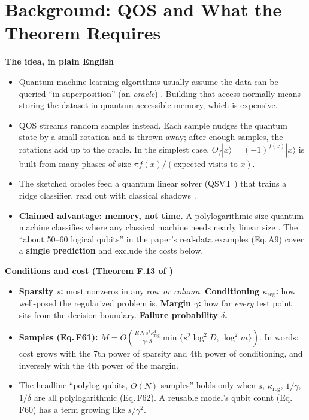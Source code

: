 \documentclass[10pt]{article}
\newcommand{\subhead}[1]{%
    \par
    \vspace{6pt}%
    \textbf{#1}%
    \par
    \vspace{2pt}%
}
\newenvironment{sectionblock}
{%
    \par
    \vspace{2pt}
    \noindent
    \begin{minipage}{\textwidth}
}
{%
    \end{minipage}
    \par
    \vspace{5pt}
}
\begin{document}
\begin{sectionblock}

\section{Background: QOS and What the Theorem Requires}
\label{sec:qos}

\subhead{The idea, in plain English}

\begin{itemize}
    \item Quantum machine-learning algorithms usually assume the data can be queried ``in superposition'' (an \emph{oracle}) \cite{aaronson2015}. Building that access normally means storing the dataset in quantum-accessible memory, which is expensive.
    \item QOS streams random samples instead. Each sample nudges the quantum state by a small rotation and is thrown away; after enough samples, the rotations add up to the oracle. In the simplest case, $O_f|x\rangle=(-1)^{f(x)}|x\rangle$ is built from many phases of size $\pi f(x)/(\text{expected visits to }x)$.
    \item The sketched oracles feed a quantum linear solver (QSVT \cite{gilyen2019qsvt,martyn2021}) that trains a ridge classifier, read out with classical shadows \cite{huang2020}.
    \item \textbf{Claimed advantage: memory, not time.} A polylogarithmic-size quantum machine classifies where any classical machine needs nearly linear size \cite{zhao2026}. The ``about 50--60 logical qubits'' in the paper's real-data examples (Eq.\,A9) cover a \textbf{single prediction} and exclude the costs below.
\end{itemize}

\subhead{Conditions and cost (Theorem F.13 of \cite{zhao2026})}

\begin{itemize}
    \item \textbf{Sparsity $s$:} most nonzeros in any row \emph{or column}. \textbf{Conditioning $\kappa_{\mathrm{reg}}$:} how well-posed the regularized problem is. \textbf{Margin $\gamma$:} how far \emph{every} test point sits from the decision boundary. \textbf{Failure probability $\delta$.}
    \item \textbf{Samples (Eq.\,F61):}
    $\displaystyle M=\tilde O\!\left(\frac{R\,N\,s^{7}\kappa_{\mathrm{reg}}^{4}}{\gamma^{4}\,\delta}\min\{s^{2}\log^{2}D,\,\log^{2}m\}\right)$.
    In words: cost grows with the 7th power of sparsity and 4th power of conditioning, and inversely with the 4th power of the margin.
    \item The headline ``polylog qubits, $\tilde O(N)$ samples'' holds only when $s$, $\kappa_{\mathrm{reg}}$, $1/\gamma$, $1/\delta$ are all polylogarithmic (Eq.\,F62). A reusable model's qubit count (Eq.\,F60) has a term growing like $s/\gamma^{2}$.
\end{itemize}

\end{sectionblock}
\end{document}
